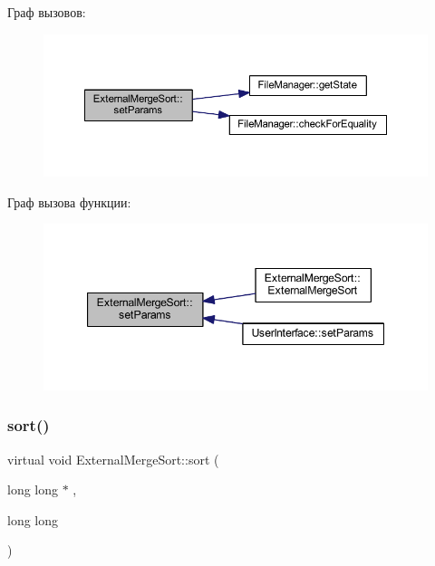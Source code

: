 Граф вызовов\+:\nopagebreak
\begin{figure}[H]
\begin{center}
\leavevmode
\includegraphics[width=350pt]{class_external_merge_sort_a2a27571acdf4f42e34798663e37f5e0b_cgraph}
\end{center}
\end{figure}
Граф вызова функции\+:\nopagebreak
\begin{figure}[H]
\begin{center}
\leavevmode
\includegraphics[width=347pt]{class_external_merge_sort_a2a27571acdf4f42e34798663e37f5e0b_icgraph}
\end{center}
\end{figure}
\hypertarget{class_external_merge_sort_af6412221cc797a846243a343ccc12dba}{}\label{class_external_merge_sort_af6412221cc797a846243a343ccc12dba} 
\subsubsection{\texorpdfstring{sort()}{sort()}}
{\footnotesize\ttfamily virtual void External\+Merge\+Sort\+::sort (\begin{DoxyParamCaption}\item[{long long $\ast$}]{,  }\item[{long}]{long }\end{DoxyParamCaption})\hspace{0.3cm}{\ttfamily [pure virtual]}}



